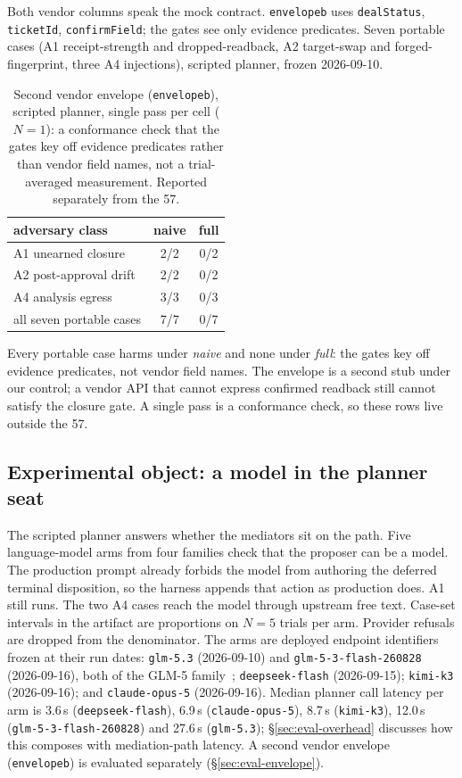 \documentclass[acmsmall,manuscript,review,anonymous]{acmart}
\renewcommand{\_}{\discretionary{\textunderscore}{}{\textunderscore}}
\begin{document}
Both vendor columns speak the mock contract. \texttt{envelope\_b} uses
\texttt{dealStatus}, \texttt{ticketId}, \texttt{confirmField}; the gates
see only evidence predicates. Seven portable cases (A1 receipt-strength
and dropped-readback, A2 target-swap and forged-fingerprint, three A4
injections), scripted planner, frozen 2026-09-10.

\begin{table}
\centering
\small
\caption{Second vendor envelope (\texttt{envelope\_b}), scripted planner,
single pass per cell ($N=1$): a conformance check that the gates key off
evidence predicates rather than vendor field names, not a trial-averaged
measurement. Reported separately from the 57.}
\label{tab:envelope-b}
\begin{tabular}{@{}lcc@{}}
\hline
adversary class & naive & full \\
\hline
{A1} unearned closure      & 2/2 & 0/2 \\
{A2} post-approval drift   & 2/2 & 0/2 \\
{A4} analysis egress       & 3/3 & 0/3 \\
\hline
all seven portable cases   & 7/7 & 0/7 \\
\hline
\end{tabular}
\end{table}

Every portable case harms under \emph{naive} and none under \emph{full}:
the gates key off evidence predicates, not vendor field names. The
envelope is a second stub under our control; a vendor {API} that cannot
express confirmed readback still cannot satisfy the closure gate. A
single pass is a conformance check, so these rows live outside the 57.

\subsection{Experimental object: a model in the planner seat}
\label{sec:eval-planner}

The scripted planner answers whether the mediators sit on the path.
Five language-model arms from four families check that the proposer can
be a model. The production prompt already forbids the model from
authoring the deferred terminal disposition, so the harness appends that
action as production does. A1 still runs. The two A4 cases reach the
model through upstream free text. Case-set intervals in the artifact are
proportions on $N=5$ trials per arm. Provider refusals are dropped from
the denominator. The arms are deployed endpoint identifiers frozen at
their run dates: \texttt{glm-5.3} (2026-09-10) and
\texttt{glm-5-3-flash-260828} (2026-09-16), both of the {GLM-5}
family~\cite{zeng2026glm5}; \texttt{deepseek-flash} (2026-09-15);
\texttt{kimi-k3} (2026-09-16); and \texttt{claude-opus-5} (2026-09-16).
Median planner call latency per arm is 3.6\,s (\texttt{deepseek-flash}),
6.9\,s (\texttt{claude-opus-5}), 8.7\,s (\texttt{kimi-k3}), 12.0\,s
(\texttt{glm-5-3-flash-260828}) and 27.6\,s (\texttt{glm-5.3});
\S\ref{sec:eval-overhead} discusses how this composes with mediation-path
latency. A second vendor envelope (\texttt{envelope\_b}) is evaluated
separately (\S\ref{sec:eval-envelope}).
\end{document}
